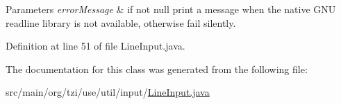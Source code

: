\begin{DoxyParams}{Parameters}
{\em error\-Message} & if not null print a message when the native G\-N\-U readline library is not available, otherwise fail silently. \\
\hline
\end{DoxyParams}


Definition at line 51 of file Line\-Input.\-java.



The documentation for this class was generated from the following file\-:\begin{DoxyCompactItemize}
\item 
src/main/org/tzi/use/util/input/\hyperlink{_line_input_8java}{Line\-Input.\-java}\end{DoxyCompactItemize}
